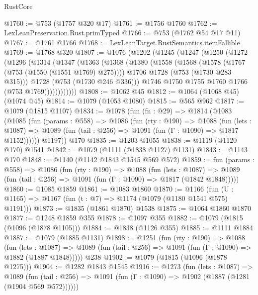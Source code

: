 \begin{lexlean}{RustCore}
\begin{coremodule}
@1760 := @753 (@1757 @320 @17)
@1761 := @1756 @1760
@1762 := LexLeanPreservation.Rust.primTyped
@1766 := @753 (@1762 @54 @17 @11)
@1767 := @1761 @1766
@1768 := LexLeanTarget.RustSemantics.itemFallible
@1769 := @1768 @320
@1807 := @1076
    (@1202
      (@1245
        (@1247
          (@1250
            (@1272
              (@1296
                (@1314
                  (@1347
                    (@1363
                      (@1368
                        (@1380
                          (@1558
                            (@1568
                              (@1578 (@1767 (@753 (@1550 (@1551 @1769) @275))))
                              @1706
                              @1728
                              (@753 (@1730 @283 @315)))
                            @1728
                            (@753 (@1730 @246 @336)))
                          @1746
                          @1750
                          @1755
                          @1760
                          @1766
                          (@753 @1769))))))))))))
@1808 := @1062 @45
@1812 := @1064 (@1068 @45) (@1074 @45)
@1814 := @1079 (@1053 @1080)
@1815 := @565 @962
@1817 := @1079 (@1815 @1107)
@1834 := @1078
    (fun (fn : @29) =>
    @1814
      (@1083
        (@1085
          (fun (params : @558) =>
          @1086
            (fun (rty : @190) =>
            @1088
              (fun (lets : @1087) =>
              @1089 (fun (tail : @256) => @1091 (fun (Γ : @1090) => @1817 @1152))))))
        @1197))
    @170
@1835 := @1203 @1055
@1838 := @1119 (@1120 @170) @1541
@1842 := @1079 (@1111 (@1838 @1127) @1131)
@1843 := @1143 @170
@1848 := @1140 (@1142 @1843 @1545 @569 @572)
@1859 := fun (params : @558) =>
  @1086
    (fun (rty : @190) =>
    @1088
      (fun (lets : @1087) =>
      @1089 (fun (tail : @256) => @1091 (fun (Γ : @1090) => @1817 (@1842 @1848)))))
@1860 := @1085 @1859
@1861 := @1083 @1860
@1870 := @1166 (fun (U : @1165) => @1167 (fun (t : @7) => @1174 (@1079 (@1180 @1541 @575) @1191)))
@1873 := @1835 (@1861 @1870) @1538
@1875 := @1064 @1860 @1870
@1877 := @1248 @1859 @355
@1878 := @1097 @355
@1882 := @1079 (@1815 (@1096 (@1878 @1105)))
@1884 := @1838 (@1126 @355)
@1885 := @1111 @1884
@1887 := @1079 (@1885 @1131)
@1898 := @1251
    (fun (rty : @190) =>
    @1088
      (fun (lets : @1087) =>
      @1089 (fun (tail : @256) => @1091 (fun (Γ : @1090) => @1882 (@1887 @1848)))))
    @238
@1902 := @1079 (@1815 (@1096 (@1878 @1275)))
@1904 := @1282 @1843 @1545
@1916 := @1273
    (fun (lets : @1087) =>
    @1089 (fun (tail : @256) => @1091 (fun (Γ : @1090) => @1902 (@1887 (@1281 (@1904 @569 @572))))))

\end{coremodule}
\end{lexlean}
